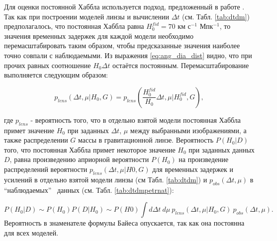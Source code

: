 Для оценки постоянной Хаббла используется подход, предложенный в работе \cite{vegaferrero}. Так как при построении моделей линзы и вычислении $\Delta t$ (см. Табл. \ref{tab:dtdm}) предполагалось, что постоянная Хаббла равна $H_0^{fid} = 70$ км с$^{-1}$ Мпк$^{-1}$, то значения временных задержек для каждой модели необходимо перемасштабировать таким образом, чтобы предсказанные значения наиболее точно совпали с наблюдаемыми. Из выражения \eqref{eq:ang_dia_dist} видно, что при прочих равных соотношение $H_0\Delta t$ остаётся постоянным. Перемасштабирование выполняется следующим образом:

\begin{equation}\label{eq:rescale}
p_{lens}(\Delta t, \mu | H_0, G) = p_{lens}(\frac{H_0^{fid}}{H_0} \Delta t, \mu | H_0^{fid}, G), 
\end{equation}

\noindent где $p_{lens}$  - вероятность того, что в отдельно взятой модели постоянная Хаббла примет значение $H_0$ при заданных $\Delta t$, $\mu$ между выбранными изображениями, а также распределении $G$ массы в гравитационной линзе. Вероятность $P( H_0 |D)$ того, что постоянная Хаббла примет некоторое значение $H_0$ при заданных данных $D$, равна произведению априорной вероятности $P(H_0)$ на произведение распределений вероятности $p_{lens}(\Delta t, \mu| H0, G)$ для временных задержек и усилений в отдельно взятой модели линзы (см Табл. \ref{tab:dtdm}) и $p_{obs}(\Delta t, \mu)$ в “наблюдаемых” \ данных (см. Табл. \ref{tab:dtdmpetrnat}): 

\begin{equation}\label{eq:probability}
P( H_0 |D) \sim P(H_0) P( D | H_0 ) \sim P(H0) \int d \Delta t \ d \mu \ p_{lens}(\Delta t, \mu| H_0, G) \ p_{obs}(\Delta t, \mu).
\end{equation}
Вероятность в знаменателе формулы Байеса опускается, так как она постоянна для всех моделей.